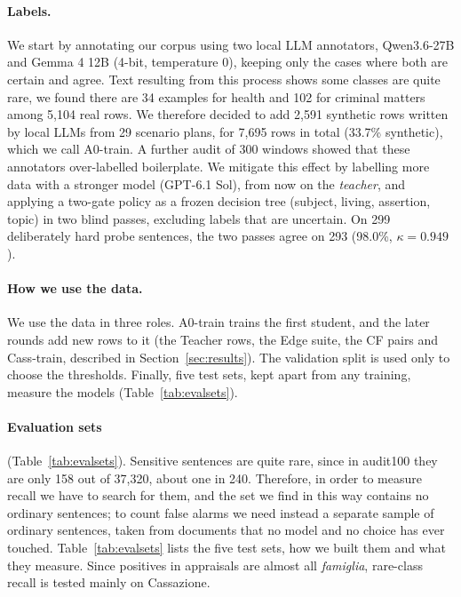 \documentclass[11pt]{article}
\begin{document}
\paragraph{Labels.} We start by annotating our corpus using two local LLM annotators, Qwen3.6-27B \citep{yang2025qwen3} and Gemma 4 12B (4-bit, temperature 0), keeping only the cases where both are certain and agree. Text resulting from this process shows some classes are quite rare, we found there are 34 examples for health and 102 for criminal matters among 5,104 real rows. We therefore decided to add 2,591 synthetic rows written by local LLMs from 29 scenario plans, for 7,695 rows in total (33.7\% synthetic), which we call A0-train. A further audit of 300 windows showed that these annotators over-labelled boilerplate. We mitigate this effect by labelling more data with a stronger model (GPT-6.1 Sol), from now on the \emph{teacher}, and applying a two-gate policy as a frozen decision tree (subject, living, assertion, topic) in two blind passes, excluding labels that are uncertain. On 299 deliberately hard probe sentences, the two passes agree on 293 (98.0\%, $\kappa=0.949$).

\paragraph{How we use the data.} We use the data in three roles. A0-train trains the first student, and the later rounds add new rows to it (the Teacher rows, the Edge suite, the CF pairs and Cass-train, described in Section~\ref{sec:results}). The validation split is used only to choose the thresholds. Finally, five test sets, kept apart from any training, measure the models (Table~\ref{tab:evalsets}).

\paragraph{Evaluation sets} (Table~\ref{tab:evalsets}). Sensitive sentences are quite rare, since in audit100 they are only 158 out of 37,320, about one in 240. Therefore, in order to measure recall we have to search for them, and the set we find in this way contains no ordinary sentences; to count false alarms we need instead a separate sample of ordinary sentences, taken from documents that no model and no choice has ever touched. Table~\ref{tab:evalsets} lists the five test sets, how we built them and what they measure. Since positives in appraisals are almost all \emph{famiglia}, rare-class recall is tested mainly on Cassazione.
\end{document}
